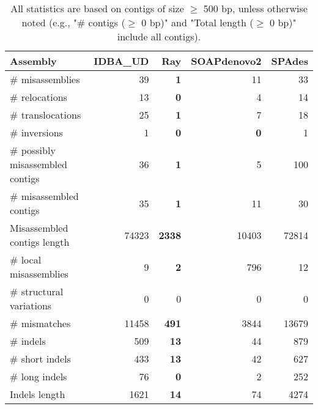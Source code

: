 \documentclass[12pt,a4paper]{article}
\begin{document}
\begin{table}[ht]
\begin{center}
\caption{All statistics are based on contigs of size $\geq$ 500 bp, unless otherwise noted (e.g., "\# contigs ($\geq$ 0 bp)" and "Total length ($\geq$ 0 bp)" include all contigs).}
\begin{tabular}{|l*{4}{|r}|}
\hline
Assembly & IDBA\_UD & Ray & SOAPdenovo2 & SPAdes \\ \hline
\# misassemblies & 39 & {\bf 1} & 11 & 33 \\ \hline
\hspace{5mm}\# relocations & 13 & {\bf 0} & 4 & 14 \\ \hline
\hspace{5mm}\# translocations & 25 & {\bf 1} & 7 & 18 \\ \hline
\hspace{5mm}\# inversions & 1 & {\bf 0} & {\bf 0} & 1 \\ \hline
\# possibly misassembled contigs & 36 & {\bf 1} & 5 & 100 \\ \hline
\# misassembled contigs & 35 & {\bf 1} & 11 & 30 \\ \hline
Misassembled contigs length & 74323 & {\bf 2338} & 10403 & 72814 \\ \hline
\# local misassemblies & 9 & {\bf 2} & 796 & 12 \\ \hline
\# structural variations & 0 & 0 & 0 & 0 \\ \hline
\# mismatches & 11458 & {\bf 491} & 3844 & 13679 \\ \hline
\# indels & 509 & {\bf 13} & 44 & 879 \\ \hline
\hspace{5mm}\# short indels & 433 & {\bf 13} & 42 & 627 \\ \hline
\hspace{5mm}\# long indels & 76 & {\bf 0} & 2 & 252 \\ \hline
Indels length & 1621 & {\bf 14} & 74 & 4274 \\ \hline
\end{tabular}
\end{center}
\end{table}
\end{document}
